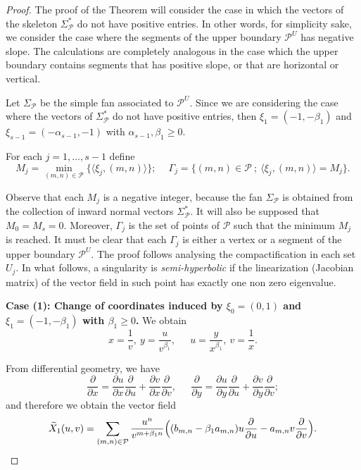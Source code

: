 \documentclass[12pt]{amsart}
\begin{document}
\begin{proof}
The proof of the Theorem will consider the case in which the vectors of the skeleton $\Sigma^{*}_{\mathcal{P}}$ do not have positive entries. In other words, for simplicity sake, we consider the case where the segments of the upper boundary $\mathcal{P}^{U}$ has negative slope. The calculations are completely analogous in the case which the upper boundary contains segments that has positive slope, or that are horizontal or vertical.

Let $\Sigma_{\mathcal{P}}$ be the simple fan associated to $\mathcal{P}^{U}$. Since we are considering the case where the vectors of $\Sigma^{*}_{\mathcal{P}}$ do not have positive entries, then $\xi_{1} = (-1,-\beta_{1})$ and $\xi_{s-1} = (-\alpha_{s-1},-1)$ with $\alpha_{s-1},\beta_{1} \geq 0$.

For each $j = 1,\dots, s-1$ define
$$M_{j} = \min_{(m,n)\in\mathcal{P}}\{\langle\xi_{j},(m,n)\rangle\}; \quad \ \Gamma_{j} = \{(m,n)\in\mathcal{P} \ ; \ \langle\xi_{j},(m,n)\rangle = M_{j} \}.$$

Observe that each $M_{j}$ is a negative integer, because the fan $\Sigma_{\mathcal{P}}$ is obtained from the collection of inward normal vectors $\Sigma^{*}_{\mathcal{P}}$. It will also be supposed that $M_{0} = M_{s} = 0$. Moreover,  $\Gamma_{j}$ is the set of points of $\mathcal{P}$ such that the minimum $M_{j}$ is reached. It must be clear that each $\Gamma_{j}$ is either a vertex or a segment of the upper boundary $\mathcal{P}^{U}$. The proof follows analysing the compactification in each set $U_{j}$. In what follows, a singularity is \emph{semi-hyperbolic} if the linearization (Jacobian matrix) of the vector field in such point has exactly one non zero eigenvalue.

\textbf{Case (1): Change of coordinates induced by $\xi_{0} = (0,1)$ and $\xi_{1} = (-1,-\beta_{1})$ with $\beta_{1} \geq 0$.} We obtain
$$x = \frac{1}{v}, \ y = \frac{u}{v^{\beta_{1}}}, \ \quad \ u = \frac{y}{x^{\beta_{1}}}, \ v = \frac{1}{x}.$$

From differential geometry, we have
$$\displaystyle\frac{\partial}{\partial x} = \displaystyle\frac{\partial u}{\partial  x}\displaystyle\frac{\partial}{\partial u} + \displaystyle\frac{\partial v}{\partial x}\displaystyle\frac{\partial}{\partial v}, \ \quad \ \displaystyle\frac{\partial}{\partial y} = \displaystyle\frac{\partial u}{\partial  y}\displaystyle\frac{\partial}{\partial u} + \displaystyle\frac{\partial v}{\partial y}\displaystyle\frac{\partial}{\partial v};$$
and therefore we obtain the vector field
$$
\widetilde{X}_{1}(u,v) = \sum_{(m,n)\in\mathcal{P}}\displaystyle\frac{u^{n}}{v^{m + \beta_{1}n}}\Big{(}(b_{m,n} - \beta_{1}a_{m,n})u\frac{\partial}{\partial u} - a_{m,n}v\frac{\partial}{\partial v}\Big{)}.$$


\end{proof}
\end{document}
